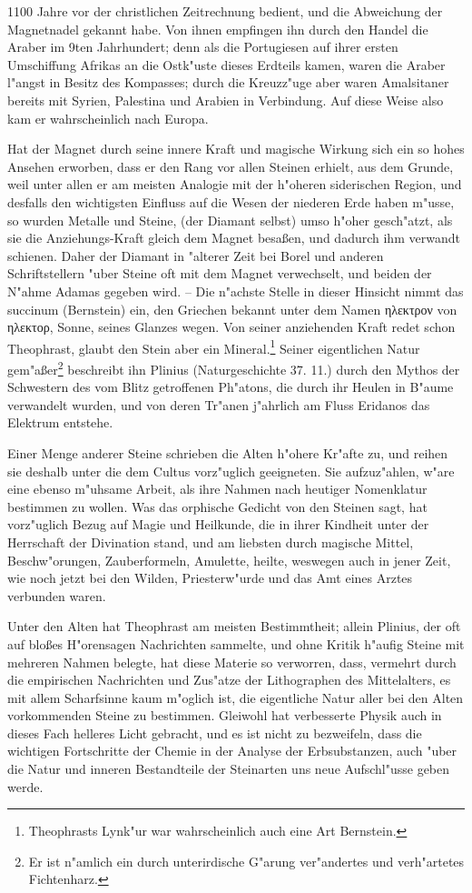 \documentclass[a4paper, 11pt, oneside, polutonikogreek, german]{article}
\begin{document}
1100 Jahre vor der christlichen Zeitrechnung bedient, und die Abweichung der Magnetnadel gekannt habe. Von ihnen empfingen ihn durch den Handel die Araber im 9ten Jahrhundert; denn als die Portugiesen auf ihrer ersten Umschiffung Afrikas an die Ostk"uste dieses Erdteils kamen, waren die Araber l"angst in Besitz des Kompasses; durch die Kreuzz"uge aber waren Amalsitaner bereits mit Syrien, Palestina und Arabien in Verbindung. Auf diese Weise also kam er wahrscheinlich nach Europa.

Hat der Magnet durch seine innere Kraft und magische Wirkung sich ein so hohes Ansehen erworben, dass er den Rang vor allen Steinen erhielt, aus dem Grunde, weil unter allen er am meisten Analogie mit der h"oheren siderischen Region, und desfalls den wichtigsten Einfluss auf die Wesen der niederen Erde haben m"usse, so wurden Metalle und Steine, (der Diamant selbst) umso h"oher gesch"atzt, als sie die Anziehungs-Kraft gleich dem Magnet besaßen, und dadurch ihm verwandt schienen. Daher der Diamant in "alterer Zeit bei Borel und anderen Schriftstellern "uber Steine oft mit dem Magnet verwechselt, und beiden der N"ahme Adamas gegeben wird. -- Die n"achste Stelle in dieser Hinsicht nimmt das succinum (Bernstein) ein, den Griechen bekannt unter dem Namen ηλεκτρον von ηλεκτορ, Sonne, seines Glanzes wegen. Von seiner anziehenden Kraft redet schon Theophrast, glaubt den Stein aber ein Mineral.\footnote{Theophrasts Lynk"ur war wahrscheinlich auch eine Art Bernstein.} Seiner eigentlichen Natur gem"aßer\footnote{Er ist n"amlich ein durch unterirdische G"arung ver"andertes und verh"artetes Fichtenharz.} beschreibt ihn Plinius (Naturgeschichte 37. 11.) durch den Mythos der Schwestern des vom Blitz getroffenen Ph"atons, die durch ihr Heulen in B"aume verwandelt wurden, und von deren Tr"anen j"ahrlich am Fluss Eridanos das Elektrum entstehe.

Einer Menge anderer Steine schrieben die Alten h"ohere Kr"afte zu, und reihen sie deshalb unter die dem Cultus vorz"uglich geeigneten. Sie aufzuz"ahlen, w"are eine ebenso m"uhsame Arbeit, als ihre Nahmen nach heutiger Nomenklatur bestimmen zu wollen. Was das orphische Gedicht von den Steinen sagt, hat vorz"uglich Bezug auf Magie und Heilkunde, die in ihrer Kindheit unter der Herrschaft der Divination stand, und am liebsten durch magische Mittel, Beschw"orungen, Zauberformeln, Amulette, heilte, weswegen auch in jener Zeit, wie noch jetzt bei den Wilden, Priesterw"urde und das Amt eines Arztes verbunden waren.

Unter den Alten hat Theophrast am meisten Bestimmtheit; allein Plinius, der oft auf bloßes H"orensagen Nachrichten sammelte, und ohne Kritik h"aufig Steine mit mehreren Nahmen belegte, hat diese Materie so verworren, dass, vermehrt durch die empirischen Nachrichten und Zus"atze der Lithographen des Mittelalters, es mit allem Scharfsinne kaum m"oglich ist, die eigentliche Natur aller bei den Alten vorkommenden Steine zu bestimmen. Gleiwohl hat verbesserte Physik auch in dieses Fach helleres Licht gebracht, und es ist nicht zu bezweifeln, dass die wichtigen Fortschritte der Chemie in der Analyse der Erbsubstanzen, auch "uber die Natur und inneren Bestandteile der Steinarten uns neue Aufschl"usse geben werde.
\end{document}
